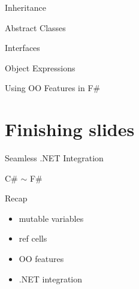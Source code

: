 \documentclass{beamer}
\begin{document}
\begin{frame}{Inheritance}
\end{frame}

\begin{frame}{Abstract Classes}
\end{frame}

\begin{frame}{Interfaces}
\end{frame}

\begin{frame}{Object Expressions}
\end{frame}

\begin{frame}{Using OO Features in F\#}
\end{frame}

\section{Finishing slides}
\frame{\tableofcontents[currentsection]}

\begin{frame}{Seamless .NET Integration}
\end{frame}

\begin{frame}{C\# $\sim$ F\#}
\end{frame}

\begin{frame}{Recap}
  \begin{itemize}[<+->]
    \item mutable variables
    \item ref cells
    \item OO features
    \item .NET integration
  \end{itemize}
\end{frame}
\end{document}
